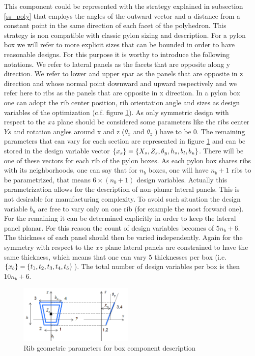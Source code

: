 This component could be represented with the strategy explained in subsection \ref{ss_poly} that employs the angles of the outward vector and a distance from a constant point in the same direction of each facet of the polyhedron. This strategy is non compatible with classic pylon sizing and description. For a pylon box we will refer to more explicit sizes that can be bounded in order to have reasonable designs. For this purpose it is worthy to introduce the following notations. We refer to lateral panels as the facets that are opposite along y direction. We refer to lower and upper spar as the panels that are opposite in z direction and whose normal point downward and upward respectively and we refer here to ribs as the panels  that are opposite in x direction. In a pylon box one can adopt the rib center position, rib orientation angle and sizes as design variables of the optimization (c.f. figure \ref{fig:3.41}). As only symmetric design with respect to the $xz$ plane should be considered some parameters like the ribs center $Ys$ and rotation angles around x and z ($\theta_x$ and $\theta_z$ ) have to be 0. The remaining parameters that can vary for each section are represented in figure \ref{fig:3.41} and can be stored in the design variable vector $\left\lbrace{x_s}\right \rbrace=\left\lbrace{X_s,Z_s,\theta_y,h_s,b_l,b_u}\right \rbrace$. There will be one of these vectors for each rib of the pylon boxes. As each pylon box shares ribs with its neighborhoods, one can say that for $n_b$ boxes, one will  have $n_b+1$ ribs to be parametrized, that means $6\times(n_b+1)$ design variables. Actually this parametrization allows for the description of non-planar lateral panels. This is not desirable for manufacturing complexity. To avoid such situation the design variable $b_u$ are free to vary only on one rib (for example the most forward one). For the remaining it can be determined explicitly in order to keep the lateral panel planar. For this reason the count of design variables becomes of $5n_b+6$. The thickness of each panel should then be varied independently. Again for the symmetry with respect to the $xz$ plane lateral panels are constrained to have the same thickness, which means that one can vary 5 thicknesses per box (i.e. $\left\lbrace{x_b}\right \rbrace=\left\lbrace{t_1,t_2,t_3,t_4,t_5}\right \rbrace$). The total number of design variables per box is then $10n_b+6$. 
  \begin{figure}[!ht]
        \centering
         \includegraphics[width=0.5\textwidth]{images/Ch3/box_section_parameters}
       \caption{Rib geometric parameters for box component description}
       \label{fig:3.41}       %
  \end{figure}
